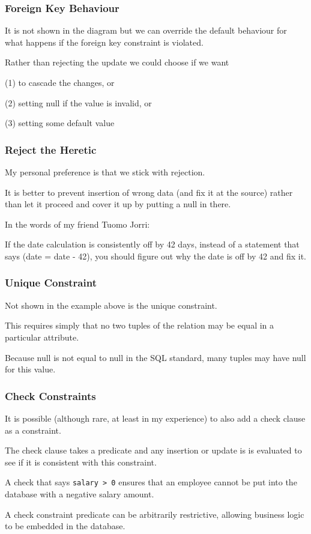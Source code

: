 \begin{frame}
\frametitle{Foreign Key Behaviour}

It is not shown in the diagram but we can override the default behaviour for what happens if the foreign key constraint is violated. 

Rather than rejecting the update we could choose if we want 

(1) to cascade the changes, or 

(2) setting null if the value is invalid, or 

(3) setting some default value

\end{frame}


\begin{frame}
\frametitle{Reject the Heretic}

My personal preference is that we stick with rejection.

It is better to prevent insertion of wrong data (and fix it at the source) rather than let it proceed and cover it up by putting a null in there. 

In the words of my friend Tuomo Jorri: 

If the date calculation is consistently off by 42 days, instead of a statement that says (date = date - 42), you should figure out why the date is off by 42 and fix it.

\end{frame}


\begin{frame}
\frametitle{Unique Constraint}

Not shown in the example above is the unique constraint. 

This requires simply that no two tuples of the relation may be equal in a particular attribute. 

Because null is not equal to null in the SQL standard, many tuples may have null for this value.

\end{frame}

\begin{frame}
\frametitle{Check Constraints}

It is possible (although rare, at least in my experience) to also add a \alert{check} clause as a constraint. 

The check clause takes a predicate and any insertion or update is is evaluated to see if it is consistent with this constraint. 

A check that says \texttt{salary > 0} ensures that an employee cannot be put into the database with a negative salary amount. 

A check constraint predicate can be arbitrarily restrictive, allowing business logic to be embedded in the database.

\end{frame}


